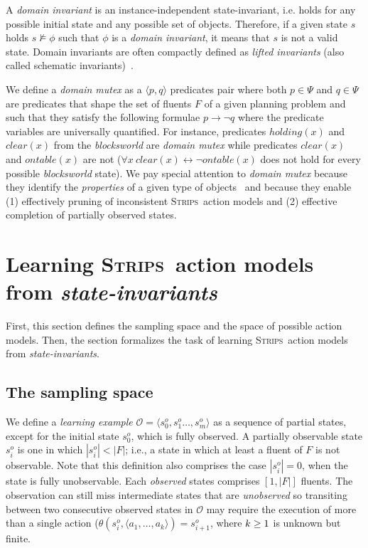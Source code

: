 \documentclass{article}
\newcommand{\tup}[1]{{\langle #1 \rangle}}
\newcommand{\strips}{\textsc{Strips}}
\begin{document}
A {\em domain invariant} is an instance-independent state-invariant, i.e. holds for any possible initial state and any possible set of objects. Therefore, if a given state $s$ holds $s\nvDash \phi$ such that $\phi$ is a {\em domain invariant}, it means that $s$ is not a valid state. Domain invariants are often compactly defined as {\em lifted invariants} (also called schematic invariants)~\cite{rintanen:schematicInvariants:AAAI2017}.

We define a {\em domain mutex} as a $\tup{p,q}$ predicates pair where both $p\in\Psi$ and $q\in\Psi$ are predicates that shape the set of fluents $F$ of a given planning problem and such that they satisfy the following formulae $p\rightarrow \neg q$ where the predicate variables are universally quantified. For instance, predicates $holding(x)$ and $clear(x)$ from the {\em blocksworld} are {\em domain mutex} while predicates $clear(x)$ and $ontable(x)$ are not ($\forall x\ clear(x)\leftrightarrow\neg ontable(x)$ does not hold for every possible {\em blocksworld} state). We pay special attention to {\em domain mutex} because they identify the {\em properties} of a given type of objects~\cite{fox:TIM:JAIR1998} and because they enable (1) effectively pruning of inconsistent \strips\ action models and (2) effective completion of partially observed states. 



\section{Learning \strips\ action models from {\em state-invariants}}
\label{sec:learning}
First, this section defines the sampling space and the space of possible action models. Then, the section formalizes the task of learning \strips\ action models from {\em state-invariants}.

\subsection{The sampling space}
We define a {\em learning example} $\mathcal{O}=\tup{s_0^o,s_1^o \ldots, s_m^o}$ as a sequence of partial states, except for the initial state $s_0^o$, which is fully observed. A partially observable state $s_i^o$ is one in which $|s_i^o| < |F|$; i.e., a state in which at least a fluent of $F$ is not observable. Note that this definition also comprises the case $|s_i^o| = 0$, when the state is fully unobservable. Each {\em observed} states comprises $[1,|F|]$ fluents. The observation can still miss intermediate states that are {\em unobserved} so transiting between two consecutive observed states in $\mathcal{O}$ may require the execution of more than a single action ($\theta(s_i^o,\tup{a_1,\ldots,a_k})=s_{i+1}^o$, where ${\small k\geq 1}$ is unknown but finite. 
\end{document}
